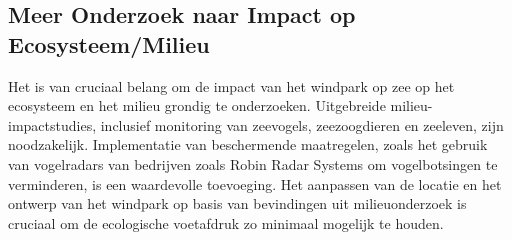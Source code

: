 \subsection{Meer Onderzoek naar Impact op Ecosysteem/Milieu}
Het is van cruciaal belang om de impact van het windpark op zee op het ecosysteem en het milieu grondig te onderzoeken. Uitgebreide milieu-impactstudies, inclusief monitoring van zeevogels, zeezoogdieren en zeeleven, zijn noodzakelijk. Implementatie van beschermende maatregelen, zoals het gebruik van vogelradars van bedrijven zoals Robin Radar Systems\cite{robinradar-bird-detection-radar,robinradar-wind-farm-bird-radar} om vogelbotsingen te verminderen, is een waardevolle toevoeging. Het aanpassen van de locatie en het ontwerp van het windpark op basis van bevindingen uit milieuonderzoek is cruciaal om de ecologische voetafdruk zo minimaal mogelijk te houden.